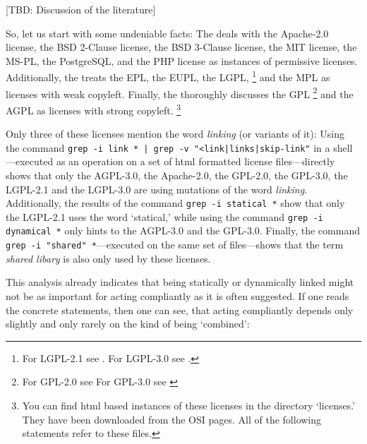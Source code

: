 [TBD: Discussion of the literature]

So, let us start with some undeniable facts: The \oslic{} deals with 
the Apache-2.0 license,\citeAPL{}
the BSD 2-Clause license,\citeBSDsimple{} 
the BSD 3-Clause license,\citeBSDnew{} 
the MIT license,\citeMIT{} 
the MS-PL,\citeMSPL{} 
the PostgreSQL,\citePGL{}
and the PHP license\citePHP{} 
as instances of permissive licenses.
Additionally, the \oslic{} treats 
the EPL,\citeEPL{} 
the EUPL,\citeEUPL{} 
the LGPL,%
  \footnote{For LGPL-2.1 see \cite[cf.][\nopage wp]{Lgpl21OsiLicense1999a}. 
  For LGPL-3.0 see \cite [cf.][\nopage wp]{Lgpl30OsiLicense2007a}.} 
and the MPL\citeMPL{}
as licenses with weak copyleft. Finally, the \oslic{} thoroughly discusses 
the GPL%
  \footnote{For GPL-2.0 see \cite [cf.][\nopage wp]{Gpl20OsiLicense1991a} 
  For GPL-3.0 see \cite [cf.][\nopage wp]{Gpl30OsiLicense2007a} } 
and the AGPL\citeAGPL{}
as licenses with strong copyleft.%
  \footnote{You can find html based instances of these licenses in the
    \oslic{} directory `licenses.' They have been downloaded from the
    OSI pages. All of the following statements refer to these files.}

\newcommand{\ttbs}{\symbol{'134}}

Only three of these licenses mention the word \emph{linking} (or variants of
it): Using the command \texttt{grep -i link * | grep -v
"<link\ttbs|links\ttbs|skip-link"} in a shell---executed
as an operation on a set of html formatted license files---directly shows that
only the AGPL-3.0, the Apache-2.0, the GPL-2.0, the GPL-3.0, the LGPL-2.1 and
the LGPL-3.0 are using mutations of the word \emph{linking}. Additionally, the
results of the command \texttt{grep -i statical *} show that only the LGPL-2.1
uses the word `statical,' while using the command \texttt{grep -i dynamical *}
only hints to the AGPL-3.0 and the GPL-3.0. Finally, the command \texttt{grep -i
"shared" *}---executed on the same set of files---shows that the term
\emph{shared libary} is also only used by these licenses.

This analysis already indicates that being statically or dynamically linked
might not be as important for acting compliantly as it is often suggested.
% 
If one reads the concrete statements, then one can see, that acting compliantly
depends only slightly and only rarely on the kind of being `combined':

